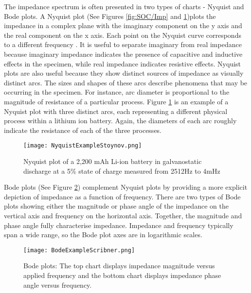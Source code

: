 The impedance spectrum is often presented in two types of charts - Nyquist and Bode plots. A Nyquist plot  (See Figures \ref{fig:SOC/Imp} and \ref{fig:NyquistStoynov})plots the impedance in a complex plane with the imaginary component on the y axis and the real component on the x axis. Each point on the Nyquist curve corresponds to a different frequency \cite{ZBStoynov2009}. It is useful to separate imaginary from  real impedance because  imaginary impedance indicates the presence of capacitive and inductive effects in the specimen, while real impedance indicates resistive effects. Nyquist plots are also useful because they show distinct sources of impedance as visually distinct arcs. The sizes and shapes of these arcs describe phenomena that may be occurring in the specimen. For instance, arc diameter is proportional to the magnitude of resistance of a particular process. Figure \ref{fig:NyquistStoynov} is an example of a Nyquist plot with three distinct arcs, each representing a different physical process within a lithium ion battery. Again, the diameters of each arc roughly indicate the resistance of each of the three processes.
\begin{figure}[H]
\centering
\texttt{[image: NyquistExampleStoynov.png]}
\caption{Nyquist plot of a 2,200 mAh Li-ion battery in galvanostatic discharge at a 5\% state of charge measured from 2512Hz to 4mHz
\label{fig:NyquistStoynov}
\cite{ZBStoynov2009}}
\end{figure}
Bode plots (See Figure \ref{fig:BodeExampleScribner}) complement Nyquist plots by providing a more explicit depiction of impedance as a function of frequency. There are two types of Bode plots showing either the magnitude or phase angle of the impedance on the vertical axis and frequency on the horizontal axis. Together, the magnitude and phase angle fully characterise impedance. Impedance and frequency typically span a wide range, so the Bode plot axes are in logarithmic scales.

\begin{figure}[H]
\centering
\texttt{[image: BodeExampleScribner.png]}
 \caption{Bode plots: The top chart displays impedance magnitude versus applied frequency and the bottom chart displays impedance phase angle versus frequency.  \label{fig:BodeExampleScribner} \cite{ScribnerAssociates}}
\end{figure} 

